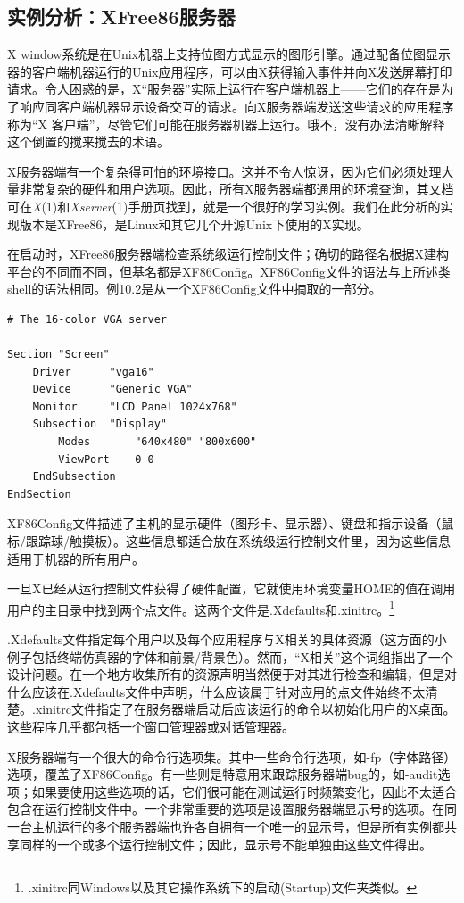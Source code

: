 \documentclass[12pt,oneside]{book}
\begin{document}
\subsection{实例分析：XFree86服务器}
X window系统是在Unix机器上支持位图方式显示的图形引擎。通过配备位图显示器的客户端机器运行的Unix应用程序，可以由X获得输入事件并向X发送屏幕打印请求。令人困惑的是，X“服务器”实际上运行在客户端机器上——它们的存在是为了响应同客户端机器显示设备交互的请求。向X服务器端发送这些请求的应用程序称为“X
客户端”，尽管它们可能在服务器机器上运行。哦不，没有办法清晰解释这个倒置的搅来搅去的术语。

X服务器端有一个复杂得可怕的环境接口。这并不令人惊讶，因为它们必须处理大量非常复杂的硬件和用户选项。因此，所有X服务器端都通用的环境查询，其文档可在\textit{X}(1)和\textit{Xserver}(1)手册页找到，就是一个很好的学习实例。我们在此分析的实现版本是XFree86，是Linux和其它几个开源Unix下使用的X实现。

在启动时，XFree86服务器端检查系统级运行控制文件；确切的路径名根据X建构平台的不同而不同，但基名都是XF86Config。XF86Config文件的语法与上所述类shell的语法相同。例10.2是从一个XF86Config文件中摘取的一部分。

\begin{Verbatim}[label=例10.2  X配置示例]
# The 16-color VGA server

Section "Screen"
    Driver      "vga16"
    Device      "Generic VGA"
    Monitor     "LCD Panel 1024x768"
    Subsection  "Display"
        Modes       "640x480" "800x600"
        ViewPort    0 0
    EndSubsection
EndSection
\end{Verbatim}


XF86Config文件描述了主机的显示硬件（图形卡、显示器）、键盘和指示设备（鼠标/跟踪球/触摸板）。这些信息都适合放在系统级运行控制文件里，因为这些信息适用于机器的所有用户。

一旦X已经从运行控制文件获得了硬件配置，它就使用环境变量HOME的值在调用用户的主目录中找到两个点文件。这两个文件是.Xdefaults和.xinitrc。\footnote{.xinitrc同Windows以及其它操作系统下的启动(Startup)文件夹类似。}

.Xdefaults文件指定每个用户以及每个应用程序与X相关的具体资源（这方面的小例子包括终端仿真器的字体和前景/背景色）。然而，“X相关”这个词组指出了一个设计问题。在一个地方收集所有的资源声明当然便于对其进行检查和编辑，但是对什么应该在.Xdefaults文件中声明，什么应该属于针对应用的点文件始终不太清楚。.xinitrc文件指定了在服务器端启动后应该运行的命令以初始化用户的X桌面。这些程序几乎都包括一个窗口管理器或对话管理器。

X服务器端有一个很大的命令行选项集。其中一些命令行选项，如-fp（字体路径）选项，覆盖了XF86Config。有一些则是特意用来跟踪服务器端bug的，如-audit选项；如果要使用这些选项的话，它们很可能在测试运行时频繁变化，因此不太适合包含在运行控制文件中。一个非常重要的选项是设置服务器端显示号的选项。在同一台主机运行的多个服务器端也许各自拥有一个唯一的显示号，但是所有实例都共享同样的一个或多个运行控制文件；因此，显示号不能单独由这些文件得出。
\end{document}
